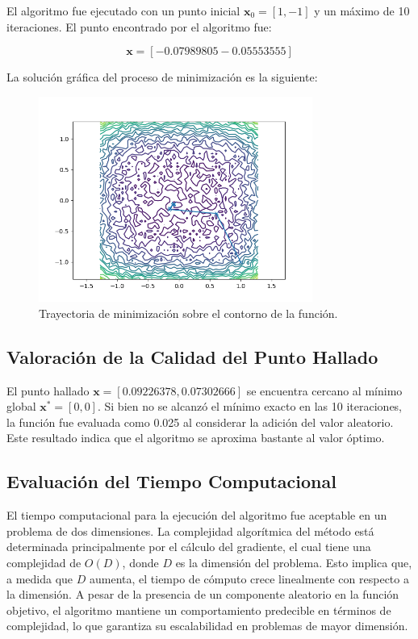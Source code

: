 \documentclass{article}
\begin{document}
	El algoritmo fue ejecutado con un punto inicial \(\mathbf{x}_0 = [1, -1]\) y un máximo de 10 iteraciones. El punto encontrado por el algoritmo fue:
	
	\[
	\mathbf{x} =  [-0.07989805 -0.05553555]
	\]
	
	La solución gráfica del proceso de minimización es la siguiente:
	
	\begin{figure}[h!]
		\centering
		\includegraphics[width=0.8\textwidth]{resultado1.png}
		\caption{Trayectoria de minimización sobre el contorno de la función.}
		\label{fig:resultado}
	\end{figure}
	
	\subsection{Valoración de la Calidad del Punto Hallado}
	
	El punto hallado \(\mathbf{x} = [0.09226378, 0.07302666]\) se encuentra cercano al mínimo global \(\mathbf{x}^* = [0, 0]\). Si bien no se alcanzó el mínimo exacto en las 10 iteraciones, la función fue evaluada como 0.025 al considerar la adición del valor aleatorio. Este resultado indica que el algoritmo se aproxima bastante al valor óptimo.
	
	\subsection{Evaluación del Tiempo Computacional}
	
	El tiempo computacional para la ejecución del algoritmo fue aceptable en un problema de dos dimensiones. La complejidad algorítmica del método está determinada principalmente por el cálculo del gradiente, el cual tiene una complejidad de \(O(D)\), donde \(D\) es la dimensión del problema. Esto implica que, a medida que \(D\) aumenta, el tiempo de cómputo crece linealmente con respecto a la dimensión. A pesar de la presencia de un componente aleatorio en la función objetivo, el algoritmo mantiene un comportamiento predecible en términos de complejidad, lo que garantiza su escalabilidad en problemas de mayor dimensión.
	
\end{document}
